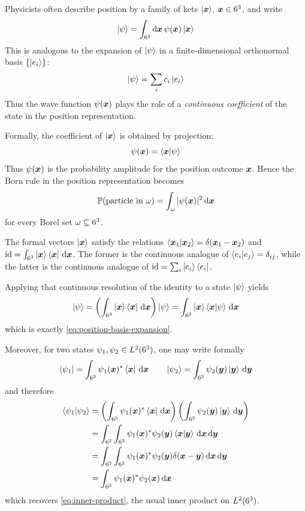 \begin{digression}\label{dig:position-basis}
Physicists often describe position by a family of kets
\(
\ket{{\boldsymbol{x}}}
\),
\(
{\boldsymbol{x}}\in6^3
\),
and write
\begin{equation}\label{eq:position-basis-expansion}
\ket{\psi}
=
\int_{6^3} \mathrm{d} {\boldsymbol{x}} \, \psi({\boldsymbol{x}}) \ket{{\boldsymbol{x}}} 
\end{equation}
This is analogous to the  expansion of \(\ket{\psi}\) in a finite-dimensional orthonormal basis \(\{\ket{e_i}\}\):
\[
\ket{\psi} = \sum_i c_i \ket{e_i}
\]
Thus the wave function \(\psi({\boldsymbol{x}})\) plays the role of a \emph{continuous coefficient} of the state in the position representation.

\medskip

Formally, the coefficient of \(\ket{{\boldsymbol{x}}}\) is obtained by projection:
\[
\psi({\boldsymbol{x}})
=
\braket{{\boldsymbol{x}}|\psi}
\]
Thus \(\psi({\boldsymbol{x}})\) is the probability amplitude for the position outcome \({\boldsymbol{x}}\).
Hence the Born rule in the position representation becomes
\[
\operatorname{\mathbb{P}}(\text{particle in }\omega)
=
\int_\omega |\psi({\boldsymbol{x}})|^2\,\mathrm{d} {\boldsymbol{x}}
\]
for every Borel set \(\omega\subseteq6^3\).

\medskip

The formal vectors \(\ket{{\boldsymbol{x}}}\) satisfy the relations
\(
\braket{{\boldsymbol{x}}_1|{\boldsymbol{x}}_2}
=
\delta({\boldsymbol{x}}_1-{\boldsymbol{x}}_2)
\)
and
\(
\operatorname{id}
=
\int_{6^3} \ket{{\boldsymbol{x}}}\bra{{\boldsymbol{x}}} \,\mathrm{d} {\boldsymbol{x}}
\).
The former is the continuous analogue of
\(
\braket{e_i|e_j}=\delta_{ij}
\),
while the latter is the continuous analogue of
\(
\operatorname{id} =\sum_i \ket{e_i}\bra{e_i}
\).

Applying that continuous resolution of the identity
to a state \(\ket{\psi}\) yields
\[
\ket{\psi}
=
\left(\int_{6^3}\ket{{\boldsymbol{x}}}\bra{{\boldsymbol{x}}}\,\mathrm{d}{\boldsymbol{x}}\right)\ket{\psi}
=
\int_{6^3}\ket{{\boldsymbol{x}}}\braket{{\boldsymbol{x}}|\psi}\,\mathrm{d}{\boldsymbol{x}}
\]
which is exactly \eqref{eq:position-basis-expansion}.

\medskip

Moreover, for two states
\(
\psi_1,\psi_2 \in L^2(6^3)
\),
one may write formally
\[
\bra{\psi_1}
=
\int_{6^3}\psi_1({\boldsymbol{x}})^* \bra{{\boldsymbol{x}}}\,\mathrm{d}{\boldsymbol{x}}
\qquad
\ket{\psi_2}
=
\int_{6^3}\psi_2({\boldsymbol{y}}) \ket{{\boldsymbol{y}}}\,\mathrm{d}{\boldsymbol{y}}
\]
and therefore
\[
\begin{aligned}
\braket{\psi_1|\psi_2}
&=
\left(\int_{6^3}\psi_1({\boldsymbol{x}})^* \bra{{\boldsymbol{x}}}\,\mathrm{d}{\boldsymbol{x}}\right)
\left(\int_{6^3}\psi_2({\boldsymbol{y}}) \ket{{\boldsymbol{y}}}\,\mathrm{d}{\boldsymbol{y}}\right)
\\
&=
\int_{6^3}\int_{6^3}
\psi_1({\boldsymbol{x}})^* \psi_2({\boldsymbol{y}}) \braket{{\boldsymbol{x}}|{\boldsymbol{y}}}
\,\mathrm{d}{\boldsymbol{x}}\,\mathrm{d}{\boldsymbol{y}}
\\
&=
\int_{6^3}\int_{6^3}
\psi_1({\boldsymbol{x}})^* \psi_2({\boldsymbol{y}}) \delta({\boldsymbol{x}}-{\boldsymbol{y}})
\,\mathrm{d}{\boldsymbol{x}}\,\mathrm{d}{\boldsymbol{y}}
\\
&=
\int_{6^3}\psi_1({\boldsymbol{x}})^*\psi_2({\boldsymbol{x}})\,\mathrm{d}{\boldsymbol{x}}
\end{aligned}
\]
which recovers \eqref{eq:inner-product}, the usual inner product on \(L^2(6^3)\).


\end{digression}
